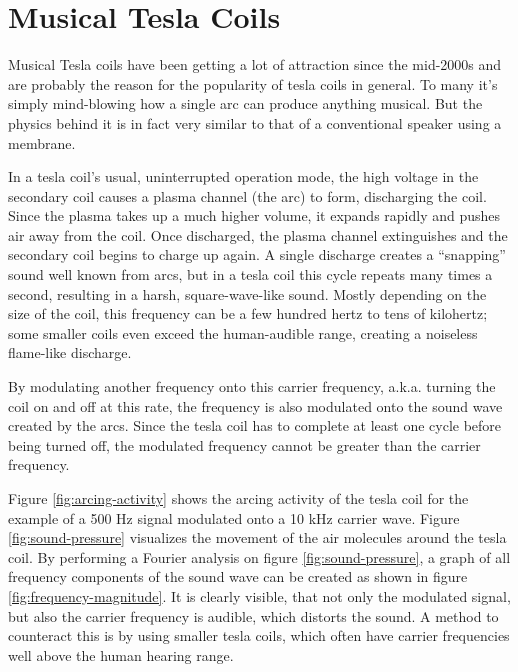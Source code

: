 
\section{Musical Tesla Coils}
\label{sec:musical-tesla-coils}

Musical Tesla coils have been getting a lot of attraction since the mid-2000s and are probably the reason for the popularity of tesla coils in general. To many it's simply mind-blowing how a single arc can produce anything musical. But the physics behind it is in fact very similar to that of a conventional speaker using a membrane.

In a tesla coil's usual, uninterrupted operation mode, the high voltage in the secondary coil causes a plasma channel (the arc) to form, discharging the coil. Since the plasma takes up a much higher volume, it expands rapidly and pushes air away from the coil. Once discharged, the plasma channel extinguishes and the secondary coil begins to charge up again. A single discharge creates a \enquote{snapping} sound well known from arcs, but in a tesla coil this cycle repeats many times a second, resulting in a harsh, square-wave-like sound. Mostly depending on the size of the coil, this frequency can be a few hundred hertz to tens of kilohertz; some smaller coils even exceed the human-audible range, creating a noiseless flame-like discharge.

By modulating another frequency onto this carrier frequency, a.k.a. turning the coil on and off at this rate, the frequency is also modulated onto the sound wave created by the arcs. Since the tesla coil has to complete at least one cycle before being turned off, the modulated frequency cannot be greater than the carrier frequency. 

Figure \ref{fig:arcing-activity} shows the arcing activity of the tesla coil for the example of a 500 Hz signal modulated onto a 10 kHz carrier wave. Figure \ref{fig:sound-pressure} visualizes the movement of the air molecules around the tesla coil. By performing a Fourier analysis on figure \ref{fig:sound-pressure}, a graph of all frequency components of the sound wave can be created as shown in figure \ref{fig:frequency-magnitude}. It is clearly visible, that not only the modulated signal, but also the carrier frequency is audible, which distorts the sound. A method to counteract this is by using smaller tesla coils, which often have carrier frequencies well above the human hearing range.

